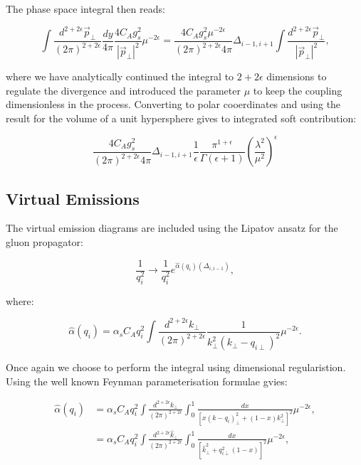 			The phase space integral then reads:

			\begin{equation}
				\int\frac{d^{2+2\epsilon}\vec{p}_{\perp}}{(2\pi)^{2+2\epsilon}}\frac{dy}{4\pi}\frac{4C_Ag_s^2}
					{|\vec{p}_\perp|^2}\mu^{-2\epsilon} = \frac{4C_Ag_s^2\mu^{-2\epsilon}}{(2\pi)^{2+2\epsilon}4\pi}
					\Delta_{i-1, i+1}\int\frac{d^{2+2\epsilon}\vec{p}_{\perp}}{|\vec{p}_\perp|^2},
			\end{equation}

			where we have analytically continued the integral to $2+2\epsilon$ dimensions to regulate the
			divergence and introduced the parameter $\mu$ to keep the coupling dimensionless in the process.
			Converting to polar cooerdinates and using the result for the volume of a unit hypersphere gives
			to integrated soft contribution:

			\begin{equation}
				\frac{4C_Ag_s^2}{(2\pi)^{2+2\epsilon}4\pi}\Delta_{i-1, i+1}\frac{1}{\epsilon}\frac{\pi^{1+\epsilon}}
					{\Gamma(\epsilon+1)}\left(\frac{\lambda^2}{\mu^2}\right)^\epsilon
					\label{eqn:soft}
			\end{equation}

	\subsection{Virtual Emissions}
		\label{sub:subsection_name}

		The virtual emission diagrams are included using the Lipatov ansatz for the gluon propagator:

		\begin{equation}
			\frac{1}{q_i^2}\longrightarrow\frac{1}{q_i^2}e^{\hat{\alpha}(q_i)(\Delta_{i,i-1})},
		\end{equation}

		where:

		\begin{equation}
			\hat{\alpha}(q_i) = \alpha_sC_Aq_i^2\int \frac{d^{2+2\epsilon}k_{\perp}}{(2\pi)^{2+2\epsilon}}
			\frac{1}{k^2_\perp(k_\perp - q_{i\perp})^2}\mu^{-2\epsilon}.
		\end{equation}

		Once again we choose to perform the integral using dimensional regularistion.
		Using the well known Feynman parameterisation formulae gvies:

		\begin{align}
			\hat{\alpha}(q_i) &= \alpha_sC_Aq_i^2\int \frac{d^{2+2\epsilon}k_{\perp}}{(2\pi)^{2+2\epsilon}}\int_0^1
				\frac{dx}{[x(k - q_{i})^2_\perp + (1-x)k_\perp^2]^2}\mu^{-2\epsilon}, \\
				&= \alpha_sC_Aq_i^2\int \frac{d^{2+2\epsilon}\hat{k}_{\perp}}{(2\pi)^{2+2\epsilon}}\int_0^1
				\frac{dx}{[\hat{k}^2 _\perp + q_{i\perp}^2(1-x)]^2}\mu^{-2\epsilon},
		\end{align}

